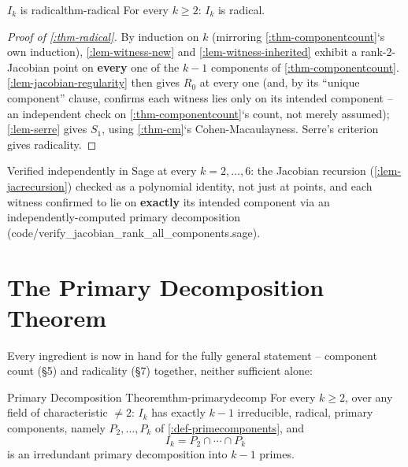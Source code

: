 \documentclass[a4paper,11pt]{scrartcl}
\begin{document}
\begin{theorem}{{}\(I_{k}\) is radical}{thm-radical} For every \(k \geq 2\): \(I_{k}\) is radical.

\end{theorem} \protect{}\label{thm-radical}{}

\begin{proof}[Proof of \cref{:thm-radical}] By induction on \(k\) (mirroring \cref{:thm-componentcount}`s own induction), \cref{:lem-witness-new} and \cref{:lem-witness-inherited} exhibit a rank-2-Jacobian point on \textbf{every} one of the \(k - 1\) components of \cref{:thm-componentcount}. \cref{:lem-jacobian-regularity} then gives \(R_{0}\) at every one (and, by its ``unique component'' clause, confirms each witness lies only on its intended component -- an independent check on \cref{:thm-componentcount}`s count, not merely assumed); \cref{:lem-serre} gives \(S_{1}\), using \cref{:thm-cm}`s Cohen-Macaulayness. Serre's criterion gives radicality.

\end{proof}

Verified independently in Sage at every \(k = 2,\ldots,6\): the Jacobian recursion (\cref{:lem-jacrecursion}) checked as a polynomial identity, not just at points, and each witness confirmed to lie on \textbf{exactly} its intended component via an independently-computed primary decomposition (code/verify\_jacobian\_rank\_all\_components.sage).

\section{The Primary Decomposition Theorem}

Every ingredient is now in hand for the fully general statement -- component count (§5) and radicality (§7) together, neither sufficient alone:

\begin{theorem}{Primary Decomposition Theorem}{thm-primarydecomp} For every \(k \geq 2\), over any field of characteristic \(\neq 2\): \(I_{k}\) has exactly \(k - 1\) irreducible, radical, primary components, namely \(P_{2},\ldots,P_{k}\) of \cref{:def-primecomponents}, and \[I_{k} = P_{2} \cap \cdots \cap P_{k}\] is an irredundant primary decomposition into \(k - 1\) primes.

\end{theorem} \protect{}\label{thm-primarydecomp}{}
\end{document}
